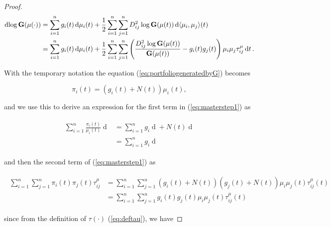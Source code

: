 \documentclass[british]{amsart} \usepackage{lmodern}
\numberwithin{equation}{section} \numberwithin{figure}{section}
\theoremstyle{plain} \newtheorem{thm}{\protect\theoremname}[section]
\theoremstyle{definition} \newtheorem{defn}[thm]{\protect\definitionname}
\theoremstyle{plain} \newtheorem{assumption}[thm]{\protect\assumptionname}
\theoremstyle{plain} \newtheorem{lem}[thm]{\protect\lemmaname}
\theoremstyle{plain} \newtheorem{prop}[thm]{\protect\propositionname}
\theoremstyle{remark} \newtheorem{rem}[thm]{\protect\remarkname}
\theoremstyle{plain} \newtheorem{cor}[thm]{\protect\corollaryname}
\renewcommand{\d}[1]{\mathop{\mathrm{d}{#1}}}
\begin{document}
\begin{proof}
  \begin{gather} 
    \begin{split} 
      \d{\log{\G{\mu(\cdot)}}} 
        &=  \sum_{i=1}^{n} g_{i}(t) \d{\mu_{i}}(t) +
            \frac{1}{2} \sum_{i=1}^{n} \sum_{j=1}^{n} D_{ij}^2\log{\Gmu} 
            \d{\langle \mu_{i}, \mu_{j} \rangle}(t) \\
        &=  \sum_{i=1}^{n} g_{i}(t) \d{\mu_{i}}(t) +
            \frac{1}{2} \sum_{i=1}^{n} \sum_{j=1}^{n} 
            \left(
              \frac{D_{ij}^2\log{\Gmu}}{\Gmu} - g_{i}(t)g_{j}(t) 
            \right)
            \mu_{i} \mu_{j} \tau_{ij}^{\mu} \d{t}. 
   \end{split} 
  \end{gather}

With the temporary notation the equation (\ref{eq:portfoliogeneratedbyG})
becomes

  \begin{equation}
    \pi_{i}(t) = (g_{i}(t) + N(t))\mu_{i}(t),
  \end{equation} 

and we use this to derive an expression for the first term in
(\ref{eq:masterstep1}) as

  \begin{gather} 
    \label{eq:masterterm1}
    \begin{split} 
        \sum_{i=1}^{n} \frac{\pi_{i}(t)}{\mu_{i}(t)} \d{\mu_{i}(t)} 
        &= \sum_{i=1}^{n} g_{i}\d{\mu_{i}(t)} + N(t)
            \d{ \left( \sum_{i=1}^{n} \mu_{i}(t) \right) } \\
        &= \sum_{i=1}^{n} g_{i}\d{\mu_{i}(t)}
   \end{split} 
  \end{gather}

and then the second term of (\ref{eq:masterstep1}) as

  \begin{gather} 
    \label{eq:masterterm2}
    \begin{split} 
      \sum_{i=1}^{n} \sum_{j=1}^{n} \pi_{i}(t)\pi_{j}(t)\tau_{ij}^{\mu} 
      &=
        \sum_{i=1}^{n} \sum_{j=1}^{n} 
          (g_{i}(t) + N(t))(g_{j}(t) + N(t)) 
         \mu_{i} \mu_{j}(t) \tau_{ij}^{\mu}(t) \\
      &=
        \sum_{i=1}^{n} \sum_{j=1}^{n} 
          g_{i}(t)g_{j}(t)\mu_{i}\mu_{j}(t)\tau_{ij}^{\mu}(t)
   \end{split} 
  \end{gather}

since from the definition of $\tau(\cdot)$ (\ref{eq:deftau}), we have


\end{proof}
\end{document}
